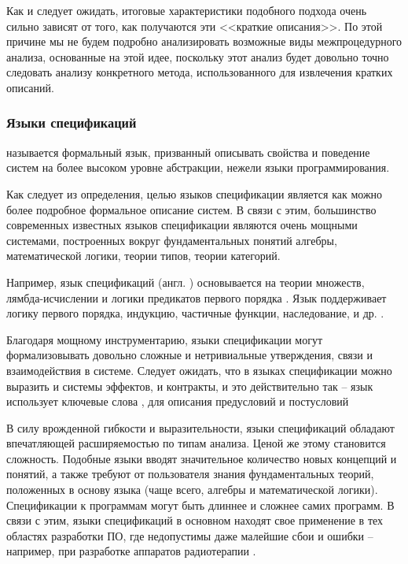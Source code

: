 Как и следует ожидать, итоговые характеристики подобного подхода очень сильно зависят от того, как получаются эти <<краткие описания>>. По этой причине мы не будем подробно анализировать возможные виды межпроцедурного анализа, основанные на этой идее, поскольку этот анализ будет довольно точно следовать анализу конкретного метода, использованного для извлечения кратких описаний.




\subsubsection{Языки спецификаций}

\begin{definition}
	 называется формальный язык, призванный описывать свойства и поведение систем на более высоком уровне абстракции, нежели языки программирования.
\end{definition}

Как следует из определения, целью языков спецификации является как можно более подробное формальное описание систем. В связи с этим, большинство современных известных языков спецификации являются очень мощными системами, построенных вокруг фундаментальных понятий алгебры, математической логики, теории типов, теории категорий.

Например, язык спецификаций  (англ. ) основывается на теории множеств, лямбда-исчислении и логики предикатов первого порядка \cite{Z-notation}. Язык  поддерживает логику первого порядка, индукцию, частичные функции, наследование, и др. \cite{CASL}.

Благодаря мощному инструментарию, языки спецификации могут формализовывать довольно сложные и нетривиальные утверждения, связи и взаимодействия в системе. Следует ожидать, что в языках спецификации можно выразить и системы эффектов, и контракты, и это действительно так -- язык  использует ключевые слова ,  для описания предусловий и постусловий \cite{Larch}

В силу врожденной гибкости и выразительности, языки спецификаций обладают впечатляющей расширяемостью по типам анализа. Ценой же этому становится сложность. Подобные языки вводят значительное количество новых концепций и понятий, а также требуют от пользователя знания фундаментальных теорий, положенных в основу языка (чаще всего, алгебры и математической логики). Спецификации к программам могут быть длиннее и сложнее самих программ. В связи с этим, языки спецификаций в основном находят свое применение в тех областях разработки ПО, где недопустимы даже малейшие сбои и ошибки -- например, при разработке аппаратов радиотерапии \cite{Jacky97}.

